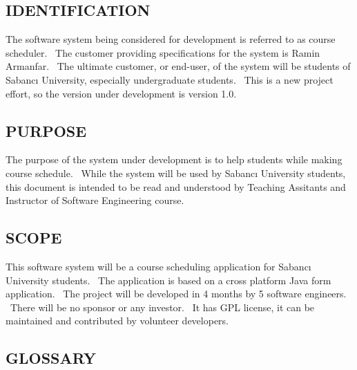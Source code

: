 \documentclass[twoside,letterpaper]{article}
\begin{document}
\subsection[IDENTIFICATION]{\rmfamily\bfseries\color{black}
IDENTIFICATION}

{\color{black}
\begin{flushleft}The software system being considered for development is referred to as course scheduler. \ The customer providing specifications
for the system is Ramin Armanfar. \ The ultimate
customer, or end-user, of the system will be students of Sabanc{\i}  University, especially undergraduate students. \ This is a new project effort, so the
version under development is version 1.0.\end{flushleft}}

\subsection[PURPOSE]{\rmfamily\bfseries\color{black}
PURPOSE}

{\color{black}
\begin{flushleft}The purpose of the system under development is to help students while making course schedule. \ While the system will be used by Sabanc{\i} University students,
this document is intended to be read and understood by Teaching Assitants and Instructor of Software Engineering course.\end{flushleft}}

\subsection[SCOPE]{\rmfamily\bfseries\color{black}
SCOPE}

{\color{black}
\begin{flushleft}
This software system will be a course scheduling application for Sabanc\i{} University students. \ The application is based on a cross platform Java form application. \ The project will be developed in 4 months by 5 software engineers. \ There will be no sponsor or any investor. \ It has GPL license, it can be maintained and contributed by volunteer developers.



\end{flushleft}}

\subsection[GLOSSARY]{\rmfamily\bfseries\color{black}
GLOSSARY}
{\itshape\color{black}}
\end{document}
